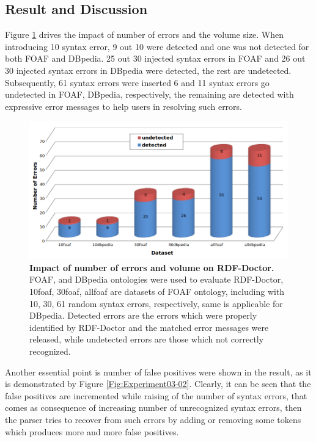 \subsection{Result and Discussion}
Figure \ref{Fig:Experiment03-01} drives the impact of number of errors and the volume size. When introducing 10 syntax error, 9 out 10 were detected and one was not detected for both FOAF and DBpedia. 25 out 30 injected syntax errors in FOAF and 26 out 30 injected syntax errors in DBpedia were detected, the rest are undetected. Subsequently, 61 syntax errors were inserted 6 and 11 syntax errors go undetected in FOAF, DBpedia, respectively, the remaining are detected with expressive error messages to help users in resolving such errors. 
\begin{figure}[ht]
\begin{center}
		\includegraphics[scale=0.55,angle=0]{images/Experiment03-01.png}
				\setlength\belowcaptionskip{-5mm}

		\caption{\textbf{Impact of number of errors and volume on RDF-Doctor.} FOAF, and DBpedia ontologies were used to evaluate RDF-Doctor, 10foaf, 30foaf, allfoaf are datasets of FOAF ontology, including with 10, 30, 61 random syntax errors, respectively, same is applicable for DBpedia. Detected errors are the errors which were properly identified by RDF-Doctor and the matched error messages were released, while undetected errors are those which not correctly recognized.}
		\label{Fig:Experiment03-01}

\end{center}
\end{figure}


Another essential point is number of false positives were shown in the result, as it is demonstrated  by Figure \ref{Fig:Experiment03-02}. Clearly, it can be seen that the false positives  are incremented while raising of the number of syntax errors, that comes as consequence of increasing number of unrecognized syntax errors, then the parser tries to recover from such errors by adding or removing some tokens which produces more and more false positives.   




